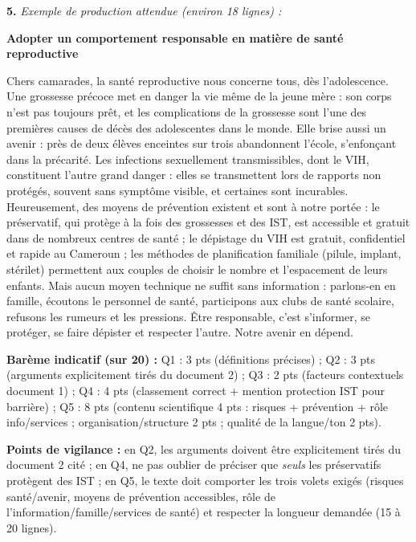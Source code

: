 \documentclass[11pt]{article}
\begin{document}
\begin{corrige}
\textbf{5.} \textit{Exemple de production attendue (environ 18 lignes) :}

\textbf{Adopter un comportement responsable en matière de santé reproductive}

Chers camarades, la santé reproductive nous concerne tous, dès l'adolescence. Une grossesse précoce met en danger la vie même de la jeune mère : son corps n'est pas toujours prêt, et les complications de la grossesse sont l'une des premières causes de décès des adolescentes dans le monde. Elle brise aussi un avenir : près de deux élèves enceintes sur trois abandonnent l'école, s'enfonçant dans la précarité. Les infections sexuellement transmissibles, dont le VIH, constituent l'autre grand danger : elles se transmettent lors de rapports non protégés, souvent sans symptôme visible, et certaines sont incurables. Heureusement, des moyens de prévention existent et sont à notre portée : le préservatif, qui protège à la fois des grossesses et des IST, est accessible et gratuit dans de nombreux centres de santé ; le dépistage du VIH est gratuit, confidentiel et rapide au Cameroun ; les méthodes de planification familiale (pilule, implant, stérilet) permettent aux couples de choisir le nombre et l'espacement de leurs enfants. Mais aucun moyen technique ne suffit sans information : parlons-en en famille, écoutons le personnel de santé, participons aux clubs de santé scolaire, refusons les rumeurs et les pressions. Être responsable, c'est s'informer, se protéger, se faire dépister et respecter l'autre. Notre avenir en dépend.

\textbf{Barème indicatif (sur 20) :} Q1 : 3 pts (définitions précises) ; Q2 : 3 pts (arguments explicitement tirés du document 2) ; Q3 : 2 pts (facteurs contextuels document 1) ; Q4 : 4 pts (classement correct + mention protection IST pour barrière) ; Q5 : 8 pts (contenu scientifique 4 pts : risques + prévention + rôle info/services ; organisation/structure 2 pts ; qualité de la langue/ton 2 pts).

\textbf{Points de vigilance :} en Q2, les arguments doivent être explicitement tirés du document 2 cité ; en Q4, ne pas oublier de préciser que \emph{seuls} les préservatifs protègent des IST ; en Q5, le texte doit comporter les trois volets exigés (risques santé/avenir, moyens de prévention accessibles, rôle de l'information/famille/services de santé) et respecter la longueur demandée (15 à 20 lignes).
\end{corrige}

\newpage
\end{document}
